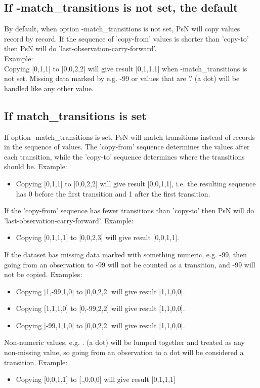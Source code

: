 \subsection{If -match\_transitions is not set, the default}
By default, when option -match\_transitions is not set, PsN will copy values record by record. If the sequence of 'copy-from' values is shorter than 'copy-to' then PsN will do 'last-observation-carry-forward'. \\
Example:\\ 
Copying [0,1,1] to [0,0,2,2] will give result [0,1,1,1] when -match\_transitions is not set. Missing data marked by e.g. -99 or values that are '.' (a dot) will be handled like any other value. 

\subsection{If match\_transitions is set}
If option -match\_transitions is set, PsN will match transitions instead of records in the sequence of values. The 'copy-from' sequence determines the values after each transition, while the 'copy-to' sequence determines where the transitions should be. Example: 
\begin{itemize}
\item Copying [0,1,1] to [0,0,2,2] will give result [0,0,1,1], i.e. the resulting sequence has 0 before the first transition and 1 after the first transition. 
\end{itemize}

\noindent If the 'copy-from' sequence has fewer transitions than 'copy-to' then PsN will do 'last-observation-carry-forward'. Example:
\begin{itemize}
\item Copying [0,1,1,1] to [0,0,2,3] will give result [0,0,1,1]. 
\end{itemize}
\noindent If the dataset has missing data marked with something numeric, e.g. -99, then going from an observation to -99 will not be counted as a transition, and -99 will not be copied. Examples:
\begin{itemize}
\item Copying [1,-99,1,0] to [0,0,2,2] will give result [1,1,0,0]. 
\item Copying [1,1,1,0] to [0,-99,2,2] will give result [1,1,0,0].
\item Copying [-99,1,1,0] to [0,0,2,2] will give result [1,1,0,0]. 
\end{itemize}

\noindent Non-numeric values, e.g. . (a dot) will be lumped together and treated as any non-missing value, so going from an observation to a dot will be considered a transition. Example:
\begin{itemize}
\item Copying [0,0,1,1] to  [.,0,0,0] will give result [0,1,1,1] 
\end{itemize}

